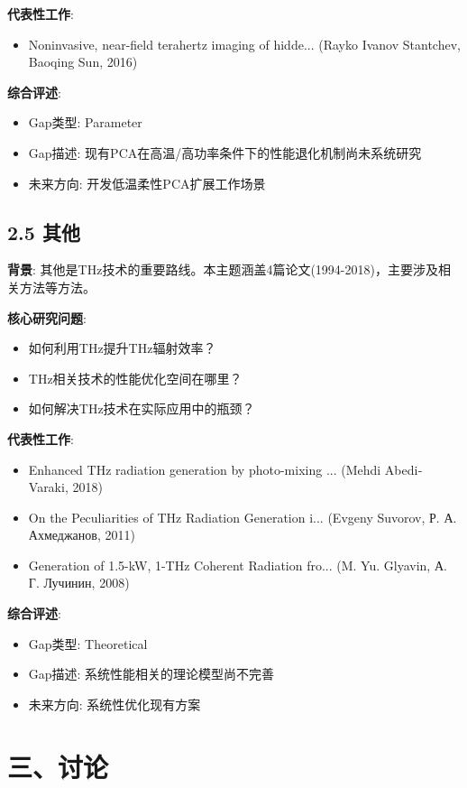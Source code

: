 \documentclass[12pt]{article}
\begin{document}
\textbf{代表性工作}:
\begin{itemize}
\item [1] Noninvasive, near-field terahertz imaging of hidde... (Rayko Ivanov Stantchev, Baoqing Sun, 2016)
\end{itemize}

\textbf{综合评述}:
\begin{itemize}
\item Gap类型: Parameter
\item Gap描述: 现有PCA在高温/高功率条件下的性能退化机制尚未系统研究
\item 未来方向: 开发低温柔性PCA扩展工作场景
\end{itemize}


\subsection{2.5 其他}

\textbf{背景}: 其他是THz技术的重要路线。本主题涵盖4篇论文(1994-2018)，主要涉及相关方法等方法。

\textbf{核心研究问题}:
\begin{itemize}
\item 如何利用THz提升THz辐射效率？
\item THz相关技术的性能优化空间在哪里？
\item 如何解决THz技术在实际应用中的瓶颈？
\end{itemize}

\textbf{代表性工作}:
\begin{itemize}
\item [1] Enhanced THz radiation generation by photo-mixing ... (Mehdi Abedi‐Varaki, 2018)
\item [2] On the Peculiarities of THz Radiation Generation i... (Evgeny Suvorov, Р. А. Ахмеджанов, 2011)
\item [3] Generation of 1.5-kW, 1-THz Coherent Radiation fro... (M. Yu. Glyavin, А. Г. Лучинин, 2008)
\end{itemize}

\textbf{综合评述}:
\begin{itemize}
\item Gap类型: Theoretical
\item Gap描述: 系统性能相关的理论模型尚不完善
\item 未来方向: 系统性优化现有方案
\end{itemize}


\section{三、讨论}
\end{document}
